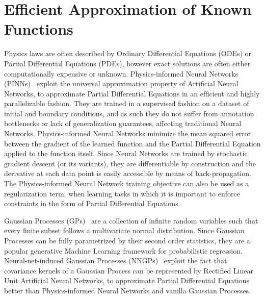 \section{Efficient Approximation of Known Functions} Physics laws are often described by Ordinary Differential Equations (ODEs) or Partial Differential Equations (PDEs), however exact solutions are often either computationally expensive or unknown.
%
Physics-informed Neural Networks (PINNs)~\cite{raissi2019physics} exploit the universal approximation property of Artificial Neural Networks, to approximate Partial Differential Equations in an efficient and highly parallelizable fashion. They are trained in a supervised fashion on a dataset of initial and boundary conditions, and as such they do not suffer from annotation bottlenecks or lack of generalization guarantees, affecting traditional Neural Networks.
Physics-informed Neural Networks minimize the mean squared error between the gradient of the learned function and the Partial Differential Equation applied to the function itself.
Since Neural Networks are trained by stochastic gradient descent (or its variants), they are differentiable by construction and the derivative at each data point is easily accessible by means of back-propagation.
The Physics-informed Neural Network training objective can also be used as a regularization term, when learning tasks in which it is important to enforce constraints in the form of Partial Differential Equations.

%
Gaussian Processes (GPs)~\cite{mackay1998introduction} are a collection of infinite random variables such that every finite subset follows a multivariate normal distribution. Since Gaussian Processes can be fully parametrized by their second order statistics, they are a popular generative Machine Learning framework for probabilistic regression.
Neural-net-induced Gaussian Processes (NNGPs)~\cite{pang2019neural} exploit the fact that covariance kernels of a Gaussian Process can be represented by Rectified Linear Unit Artificial Neural Networks, to approximate Partial Differential Equations better than Physics-informed Neural Networks and vanilla Gaussian Processes.

